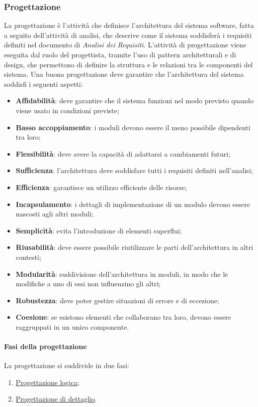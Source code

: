 \subsubsection{Progettazione}
\label{subsubsection:progettazione}
La progettazione è l'attività che definisce l'architettura del sistema software, fatta a seguito dell'attività di analisi, che descrive come il sistema soddisferà i requisiti definiti nel documento di \textit{Analisi dei Requisiti}.
L'attività di progettazione viene eseguita dal ruolo del progettista, tramite l'uso di pattern architetturali e di design, che permettono di definire la struttura e le relazioni tra le componenti del sistema.
Una buona progettazione deve garantire che l'architettura del sistema soddisfi i seguenti aspetti:
\begin{itemize}
    \item \textbf{Affidabilità}: deve garantire che il sistema funzioni nel modo previsto quando viene usato in condizioni previste;
    \item \textbf{Basso accoppiamento}: i moduli devono essere il meno possibile dipendenti tra loro;
    \item \textbf{Flessibilità}: deve avere la capacità di adattarsi a cambiamenti futuri;
    \item \textbf{Sufficienza}: l'architettura deve soddisfare tutti i requisiti definiti nell'analisi;
    \item \textbf{Efficienza}: garantisce un utilizzo efficiente delle risorse;
    \item \textbf{Incapsulamento}: i dettagli di implementazione di un modulo devono essere nascosti agli altri moduli;
    \item \textbf{Semplicità}: evita l'introduzione di elementi superflui;
    \item \textbf{Riusabilità}: deve essere possibile riutilizzare le parti dell'architettura in altri contesti;
    \item \textbf{Modularità}: suddivisione dell'architettura in moduli, in modo che le modifiche a uno di essi non influenzino gli altri;
    \item \textbf{Robustezza}: deve poter gestire situazioni di errore e di eccezione;
    \item \textbf{Coesione}: se esistono elementi che collaborano tra loro, devono essere raggruppati in un unico componente.
\end{itemize}

\paragraph{Fasi della progettazione}
La progettazione si suddivide in due fasi:
\begin{enumerate}
    \item \hyperref[subpar:progettazione_logica]{Progettazione logica};
    \item \hyperref[subpar:progettazione_dettaglio]{Progettazione di dettaglio}.
\end{enumerate}

